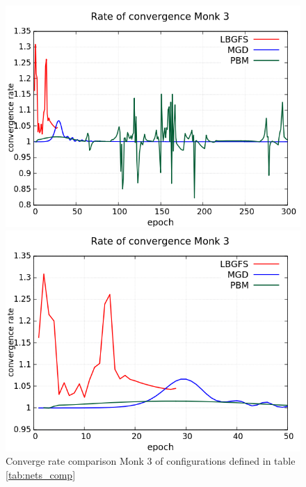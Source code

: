 \begin{figure}[H]
	\centering
	\begin{minipage}[t]{0.5\linewidth}
		\includegraphics[width=\linewidth]{data/Comparison/Monk3/Monk3_CR_standard.png}
	\end{minipage}%
	\begin{minipage}[t]{0.5\linewidth}
		\includegraphics[width=\linewidth]{data/Comparison/Monk3/Monk3_CR_zoom.png}
	\end{minipage}
	\caption{Converge rate comparison Monk 3 of configurations defined in table \ref{tab:nets_comp}}
	\label{CR-Monk3}
\end{figure}

